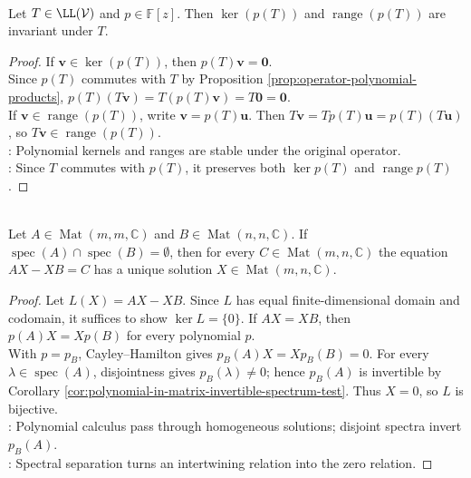 \begin{proposition} \label{prop:kernel-range-polynomial-in-operator-invariant} \label{prop:kernel-of-polynomial-in-operator-is-invariant} \\
Let $T\in\LL(\mathcal{V})$ and $p\in\mathbb{F}[z]$. Then $\ker(p(T))$ and $\operatorname{range}(p(T))$ are invariant under $T$.
\begin{proof}
If $\mathbf{v}\in\ker(p(T))$, then $p(T)\mathbf{v}=\mathbf{0}$.\\
Since $p(T)$ commutes with $T$ by Proposition \ref{prop:operator-polynomial-products}, $p(T)(T\mathbf{v})=T(p(T)\mathbf{v})=T\mathbf{0}=\mathbf{0}$.\\
If $\mathbf{v}\in\operatorname{range}(p(T))$, write $\mathbf{v}=p(T)\mathbf{u}$. Then $T\mathbf{v}=Tp(T)\mathbf{u}=p(T)(T\mathbf{u})$, so $T\mathbf{v}\in\operatorname{range}(p(T))$.\\
: Polynomial kernels and ranges are stable under the original operator.\\
: Since $T$ commutes with $p(T)$, it preserves both $\ker p(T)$ and $\operatorname{range}p(T)$.
\end{proof}
\end{proposition}

\begin{theorem} \label{thm:sylvester-linear-matrix-equation} \\
Let $A\in\operatorname{Mat}(m,m,\mathbb{C})$ and $B\in\operatorname{Mat}(n,n,\mathbb{C})$. If $\operatorname{spec}(A)\cap\operatorname{spec}(B)=\emptyset$, then for every $C\in\operatorname{Mat}(m,n,\mathbb{C})$ the equation $AX-XB=C$ has a unique solution $X\in\operatorname{Mat}(m,n,\mathbb{C})$.
\begin{proof}
Let $L(X)=AX-XB$. Since $L$ has equal finite-dimensional domain and codomain, it suffices to show $\ker L=\{0\}$. If $AX=XB$, then $p(A)X=Xp(B)$ for every polynomial $p$. \\
With $p=p_B$, Cayley--Hamilton gives $p_B(A)X=Xp_B(B)=0$. For every $\lambda\in\operatorname{spec}(A)$, disjointness gives $p_B(\lambda)\neq0$; hence $p_B(A)$ is invertible by Corollary \ref{cor:polynomial-in-matrix-invertible-spectrum-test}. Thus $X=0$, so $L$ is bijective.\\
: Polynomial calculus pass through homogeneous solutions; disjoint spectra invert $p_B(A)$.\\
: Spectral separation turns an intertwining relation into the zero relation.
\end{proof}
\end{theorem}

